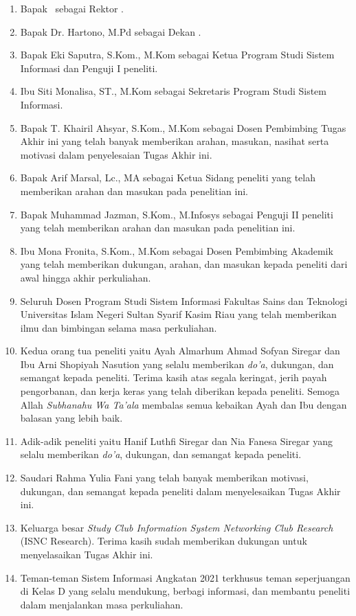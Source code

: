 \begin{enumerate}
	\item Bapak \rektor\ sebagai Rektor \universitas.
	\item Bapak Dr. Hartono, M.Pd sebagai Dekan \fakultas.
	\item Bapak Eki Saputra, S.Kom., M.Kom sebagai Ketua Program Studi Sistem Informasi dan Penguji I peneliti.
	\item Ibu Siti Monalisa, ST., M.Kom sebagai Sekretaris Program Studi Sistem Informasi.
	\item Bapak T. Khairil Ahsyar, S.Kom., M.Kom sebagai Dosen Pembimbing Tugas Akhir ini yang telah banyak memberikan arahan, masukan, nasihat serta motivasi dalam penyelesaian Tugas Akhir ini.
	\item Bapak Arif Marsal, Lc., MA sebagai Ketua Sidang peneliti yang telah memberikan arahan dan masukan pada penelitian ini.
	\item Bapak Muhammad Jazman, S.Kom., M.Infosys sebagai Penguji II peneliti yang telah memberikan arahan dan masukan pada penelitian ini.
	\item Ibu Mona Fronita, S.Kom., M.Kom sebagai Dosen Pembimbing Akademik yang telah memberikan dukungan, arahan, dan masukan kepada peneliti dari awal hingga akhir perkuliahan.
	\item Seluruh Dosen Program Studi Sistem Informasi Fakultas Sains dan Teknologi Universitas Islam Negeri Sultan Syarif Kasim Riau yang telah memberikan ilmu dan bimbingan selama masa perkuliahan.
	\item Kedua orang tua peneliti yaitu Ayah Almarhum Ahmad Sofyan Siregar dan Ibu Arni Shopiyah Nasution yang selalu memberikan \textit{do'a}, dukungan, dan semangat kepada peneliti. Terima kasih atas segala keringat, jerih payah pengorbanan, dan kerja keras yang telah diberikan kepada peneliti. Semoga Allah \textit{Subhanahu Wa Ta’ala} membalas semua kebaikan Ayah dan Ibu dengan balasan yang lebih baik.
	\item Adik-adik peneliti yaitu Hanif Luthfi Siregar dan Nia Fanesa Siregar yang selalu memberikan \textit{do'a}, dukungan, dan semangat kepada peneliti.
	\item Saudari Rahma Yulia Fani yang telah banyak memberikan motivasi, dukungan, dan semangat kepada peneliti dalam menyelesaikan Tugas Akhir ini.
	\item Keluarga besar \textit{Study Club Information System Networking Club Research} (ISNC Research). Terima kasih sudah memberikan dukungan untuk menyelasaikan Tugas Akhir ini.
	\item Teman-teman Sistem Informasi Angkatan 2021 terkhusus teman seperjuangan di Kelas D yang selalu mendukung, berbagi informasi, dan membantu peneliti dalam menjalankan masa perkuliahan.

\end{enumerate}
